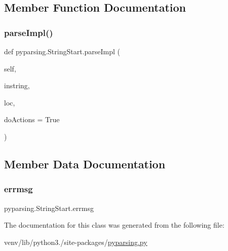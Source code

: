 \subsection{Member Function Documentation}
\mbox{\label{classpyparsing_1_1StringStart_aa40cdfe465bfd494a2eff55641cdc347}} 
\subsubsection{\texorpdfstring{parse\+Impl()}{parseImpl()}}
{\footnotesize\ttfamily def pyparsing.\+String\+Start.\+parse\+Impl (\begin{DoxyParamCaption}\item[{}]{self,  }\item[{}]{instring,  }\item[{}]{loc,  }\item[{}]{do\+Actions = {\ttfamily True} }\end{DoxyParamCaption})}



\subsection{Member Data Documentation}
\mbox{\label{classpyparsing_1_1StringStart_a9c2e4863b415c0fb8d9b012e2a0f5178}} 
\subsubsection{\texorpdfstring{errmsg}{errmsg}}
{\footnotesize\ttfamily pyparsing.\+String\+Start.\+errmsg}



The documentation for this class was generated from the following file\+:\begin{DoxyCompactItemize}
\item 
venv/lib/python3./site-\/packages/\hyperlink{pyparsing_8py}{pyparsing.\+py}\end{DoxyCompactItemize}

